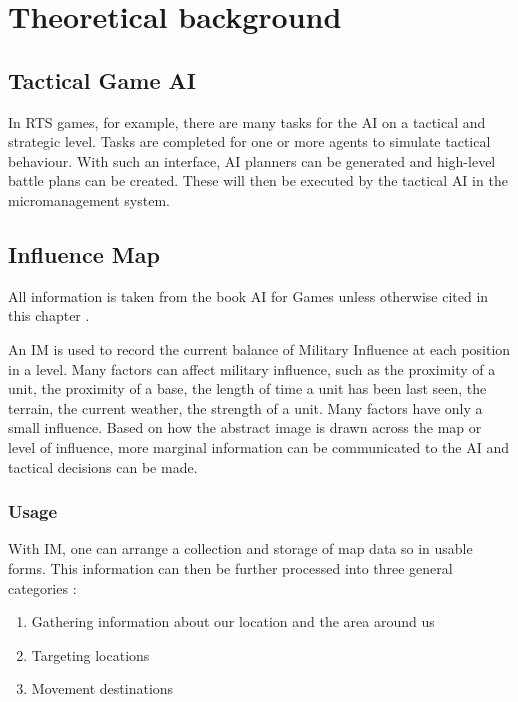 \documentclass[]{report}
\begin{document}
	\chapter{Theoretical background}
	
	\section{Tactical Game AI}
	In \ac{RTS} games, for example, there are many tasks for the \ac{AI} on a tactical and strategic level. Tasks are completed for one or more agents to simulate tactical behaviour. With such an interface, \ac{AI} planners can be generated and high-level battle plans can be created. These will then be executed by the tactical \ac{AI} in the micromanagement system. \citep{tacticalGameAi} \newline
	
	
	\section{Influence Map}
	All information is taken from the book \ac{AI} for Games unless otherwise cited in this chapter \citep{AIforGamesTactical}.
	\newline
	
	An \ac{IM} is used to record the current balance of Military Influence at each position in a level. Many factors can affect military influence, such as the proximity of a unit, the proximity of a base, the length of time a unit has been last seen, the terrain, the current weather, the strength of a unit. Many factors have only a small influence. Based on how the abstract image is drawn across the map or level of influence, more marginal information can be communicated to the \ac{AI} and tactical decisions can be made.
	
	\subsection{Usage} \label{usage}
	With \ac{IM}, one can arrange a collection and storage of map data so in usable forms. This information can then be further processed into three general categories \citep{gameAIPro}:
	
	\begin{enumerate}
		\item Gathering information about our location and the area around us
		\item Targeting locations
		\item Movement destinations
	\end{enumerate}
	
\end{document}
